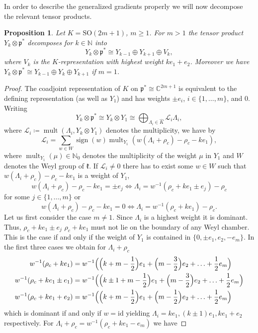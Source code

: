 \documentclass[JEP,XML,SOM,NoFloatCountersInSection,Unicode,published]{cedram}
\newtheorem{proposition}[theorem]{Proposition}
\theoremstyle{definition}
\newcommand{\mc}[1]{\ensuremath{\mathcal{#1}}}
\newcommand{\mf}[1]{\ensuremath{\mathfrak{#1}}}
\newcommand{\on}[1]{\ensuremath{\operatorname{#1}}}
\newcommand{\rhoc}{\ensuremath{\rho_c}}
\newcommand{\C}{\ensuremath{\mathbb{C}}}
\newcommand{\SO}[1]{\ensuremath{\mathrm{SO}(#1)}}
\begin{document}
In order to describe the generalized gradients properly we will now decompose the relevant tensor products.
\begin{proposition}\label{prop:tensor_decomp_odd}
Let $K=\SO{2m+1}$, $m\geq1$. For $m>1$ the tensor product $Y_k\otimes\mf p^*$ decomposes for $k\in\mathbb{N}$ into
\[
Y_k\otimes\mf p^*\cong Y_{k-1}\oplus Y_{k+1}\oplus V_k,
\]
where $V_k$ is the $K$-representation with highest weight $k e_1+ e_2$. Moreover we have $Y_k\otimes\mf p^*\cong Y_{k-1}\oplus Y_k\oplus Y_{k+1}$ if $m=1$.
\end{proposition}
\begin{proof}
The coadjoint representation of $K$ on $\mf p^*\cong \C^{2m+1}$ is equivalent to the defining representation (as well as $Y_1$) and has weights $\pm e_i$, $i\in\{1,\ldots,m\}$, and $0$. Writing
\[
Y_k\otimes\mf p^*\cong Y_k\otimes Y_1\cong\bigoplus_{\Lambda_i\in\hat K}\mathcal{L}_i\Lambda_i,
\]
where $\mc{L}_i\coloneqq\on{mult}(\Lambda_i, Y_k\otimes Y_1)$ denotes the multiplicity, we have by \cite[p.\,274]{FuchsSchweigert}
\[
\mc{L}_i=\sum_{w\in W}\on{sign}(w)\on{mult}_{Y_1}(w(\Lambda_i+\rhoc)-\rhoc-k e_1),
\]
where $\on{mult}_{Y_1}(\mu)\in\mathbb N_0$ denotes the multiplicity of the weight $\mu$ in $Y_1$ and $W$ denotes the Weyl group of $\mf k$. If $\mc L_i\neq0$ there has to exist some $w\in W$ such that $w(\Lambda_i+\rhoc)-\rhoc-k e_1$ is a weight of $Y_1$, \ie
\[
w(\Lambda_i+\rhoc)-\rhoc-k e_1=\pm e_j\iff\Lambda_i=w^{-1}(\rhoc+k e_1\pm e_j)-\rhoc
\]
for some $j\in\{1,\ldots,m\}$ or
\[
w(\Lambda_i+\rhoc)-\rhoc-k e_1=0\iff\Lambda_i=w^{-1}(\rhoc+k e_1)-\rhoc.
\]
Let us first consider the case $m\neq 1$. Since $\Lambda_i$ is a highest weight it is dominant. Thus, $\rhoc+k e_1\pm e_j$ \resp $\rhoc+k e_1$ must not lie on the boundary of any Weyl chamber. This is the case if and only if the weight of $Y_1$ is contained in $\{0,\pm e_1, e_2,- e_m\}$. In the first three cases we obtain for $\Lambda_i+\rhoc$
\begin{align*}
w^{-1}(\rhoc+k e_1)&=w^{-1}\Bigl(\Bigl(k+m-\frac12\Bigr) e_1+\Bigl(m-\frac32\Bigr) e_2+\ldots+\frac12 e_m\Bigr)\\
w^{-1}(\rhoc+k e_1\pm e_1)&=w^{-1}\Bigl(\Bigl(k\pm1+m-\frac12\Bigr) e_1+\Bigl(m-\frac32\Bigr) e_2+\ldots+\frac12 e_m\Bigr)\\
w^{-1}(\rhoc+k e_1+ e_2)&=w^{-1}\Bigl(\Bigl(k+m-\frac12\Bigr) e_1+\Bigl(m-\frac12\Bigr) e_2+\ldots+\frac12 e_m\Bigr)
\end{align*}
which is dominant if and only if $w=\mathrm{id}$ yielding $\Lambda_i=k e_1,(k\pm1) e_1, k e_1+ e_2$ respectively. For $\Lambda_i+\rhoc=w^{-1}(\rhoc+k e_1- e_m)$ we have

\end{proof}
\end{document}
